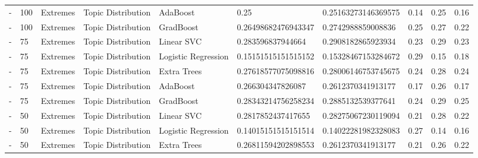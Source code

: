 \begin{table}[]
\begin{tabular}{@{}llllllllll@{}}
    -                   & 100             & Extremes              & Topic Distribution    & AdaBoost            & 0.25                    & 0.25163273146369575    & 0.14               & 0.25            & 0.16              \\
    -                   & 100             & Extremes              & Topic Distribution    & GradBoost           & 0.26498682476943347     & 0.2742988859008836     & 0.25               & 0.27            & 0.22              \\
    -                   & 75              & Extremes              & Topic Distribution    & Linear SVC          & 0.283596837944664       & 0.2908182865923934     & 0.23               & 0.29            & 0.23              \\
    -                   & 75              & Extremes              & Topic Distribution    & Logistic Regression & 0.15151515151515152     & 0.15328467153284672    & 0.29               & 0.15            & 0.18              \\
    -                   & 75              & Extremes              & Topic Distribution    & Extra Trees         & 0.27618577075098816     & 0.28006146753745675    & 0.24               & 0.28            & 0.24              \\
    -                   & 75              & Extremes              & Topic Distribution    & AdaBoost            & 0.266304347826087       & 0.2612370341913177     & 0.17               & 0.26            & 0.17              \\
    -                   & 75              & Extremes              & Topic Distribution    & GradBoost           & 0.28343214756258234     & 0.2885132539377641     & 0.24               & 0.29            & 0.25              \\
    -                   & 50              & Extremes              & Topic Distribution    & Linear SVC          & 0.2817852437417655      & 0.28275067230119094    & 0.21               & 0.28            & 0.22              \\
    -                   & 50              & Extremes              & Topic Distribution    & Logistic Regression & 0.14015151515151514     & 0.14022281982328083    & 0.27               & 0.14            & 0.16              \\
    -                   & 50              & Extremes              & Topic Distribution    & Extra Trees         & 0.26811594202898553     & 0.2612370341913177     & 0.21               & 0.26            & 0.22              \\

\end{tabular}
\end{table}
